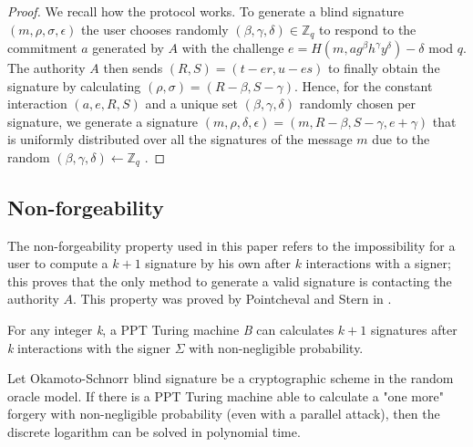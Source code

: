\documentclass[conference]{llncs}
\begin{document}
\begin{proof}
We recall how the protocol works. To generate a blind signature $(m,\rho,\sigma,\epsilon)$ the user chooses randomly $(\beta,\gamma,\delta)\in \mathbb{Z}_q$ to respond to the commitment $a$ generated by $A$ with the challenge $e=H(m,ag^\beta h^\gamma y^\delta) -\delta$ mod $q$. The authority $A$ then sends $(R,S)=(t-er,u-es)$ to finally obtain the signature by calculating $(\rho,\sigma)=(R-\beta,S-\gamma)$.
Hence, for the constant interaction $(a,e,R,S)$ and a unique set $(\beta,\gamma,\delta)$ randomly chosen per signature, we generate a signature $(m,\rho,\delta,\epsilon)=(m,R-\beta,S-\gamma,e+\gamma)$ that is uniformly distributed over all the signatures of the message $m$ due to the random $(\beta,\gamma,\delta) \gets \mathbb{Z}_q$ \cite{schnorr2001security}.
\end{proof}

\subsection{Non-forgeability}
The non-forgeability property used in this paper refers to the impossibility for a user to compute a $k+1$ signature by his own after $k$ interactions with a signer; this proves that the only method to generate a valid signature is contacting the authority $A$. This property was proved by Pointcheval and Stern in \cite{pointcheval1996provably}.

\begin{definition}
For any integer \textit{k}, a PPT Turing machine \textit{B} can calculates $k+1$ signatures after \textit{k} interactions with the signer $\Sigma$ with non-negligible probability.  
\end{definition}

\begin{theorem}
Let Okamoto-Schnorr blind signature be a cryptographic scheme in the random oracle model. If there is a PPT Turing machine able to calculate a "one more" forgery with non-negligible probability (even with a parallel attack), then the discrete logarithm can be solved in polynomial time.
\end{theorem}
\end{document}
